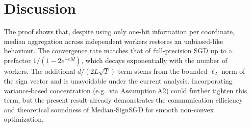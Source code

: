 \documentclass{article}
\begin{document}
\section*{Discussion}
The proof shows that, despite using only one‑bit information per coordinate,
median aggregation across independent workers restores an unbiased‑like
behaviour.  The convergence rate matches that of full‑precision SGD up to a
prefactor $1/(1-2e^{-cM})$, which decays exponentially with the number of
workers.  The additional $d/(2L\sqrt{T})$ term stems from the bounded
$\ell_{2}$‑norm of the sign vector and is unavoidable under the current
analysis.  Incorporating variance‑based concentration (e.g.\ via Assumption A2)
could further tighten this term, but the present result already demonstrates
the communication efficiency and theoretical soundness of Median‑SignSGD
for smooth non‑convex optimization.
\end{document}
